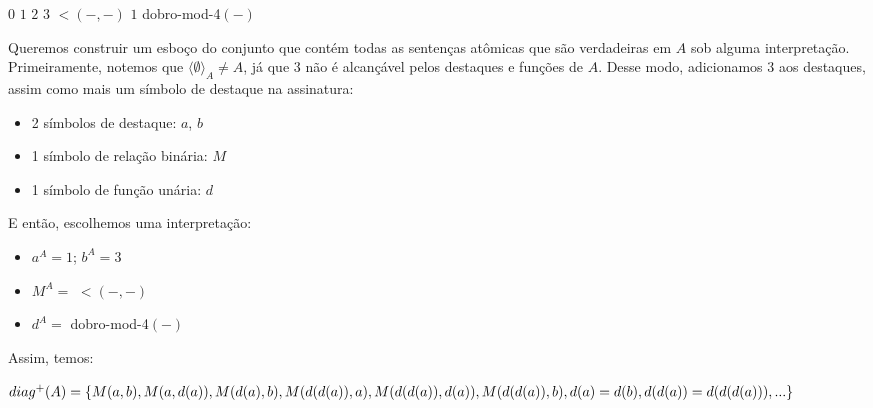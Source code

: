 \begin{rexercises}
\begin{question}
        \begin{center}
            \begin{structure}
                {}
                {$0$ $1$ $2$ $3$}
                {$<$$(-,-)$}
                {$1$}
                {dobro-mod-4$(-)$}
            \end{structure}
        \end{center}
        \begin{resolution}
            Queremos construir um esboço do conjunto que contém todas as sentenças atômicas que são verdadeiras em $A$ sob alguma interpretação. Primeiramente, notemos que $\langle \emptyset \rangle_A \neq A$, já que $3$ não é alcançável pelos destaques e funções de $A$. Desse modo, adicionamos $3$ aos destaques, assim como mais um símbolo de destaque na assinatura:
            \begin{itemize}
                \item 2 símbolos de destaque: $a$, $b$
                \item 1 símbolo de relação binária: $M$
                \item 1 símbolo de função unária: $d$
            \end{itemize}
            E então, escolhemos uma interpretação:
            \begin{itemize}
                \item $a^A = 1$; $b^A = 3$
                \item $M^A =$ $<$$(-,-)$
                \item $d^A =$ dobro-mod-4$(-)$ 
            \end{itemize}
            Assim, temos:

            $diag^+(A) = \{M(a, b), M(a, d(a)), M(d(a), b), M(d(d(a)), a), M(d(d(a)), d(a)),\\ M(d(d(a)), b), d(a) = d(b), d(d(a)) = d(d(d(a))), ...\}$
        \end{resolution}
    \end{question}


\end{rexercises}
